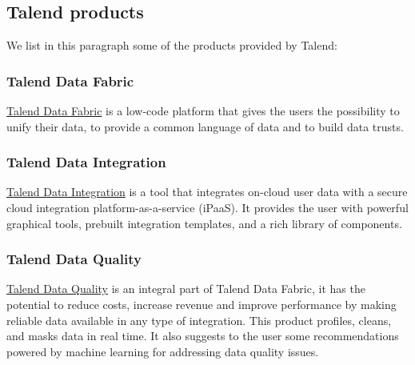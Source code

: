 \subsection*{Talend products}
We list in this paragraph some of the products provided by Talend:
\subsubsection*{Talend Data Fabric}
\href{https://www.talend.com/products/data-fabric/}{Talend Data Fabric} is a
low-code platform that gives the users the possibility to unify their data,
to provide a common language of data and to build data trusts.

\subsubsection*{Talend Data Integration}
\href{https://www.talend.com/products/integrate-data/}{Talend Data Integration} 
is a tool that integrates on-cloud user data with a secure cloud integration
platform-as-a-service (iPaaS). It provides the user with powerful graphical
tools, prebuilt integration templates, and a rich library of components.

\subsubsection*{Talend Data Quality}
\href{https://www.talend.com/products/data-quality/}{Talend Data Quality} is an
integral part of Talend Data Fabric, it has the potential to reduce costs,
increase revenue and improve performance by making reliable data available in
any type of integration. This product profiles, cleans, and masks data in real
time. It also suggests to the user some recommendations powered by machine
learning for addressing data quality issues.






